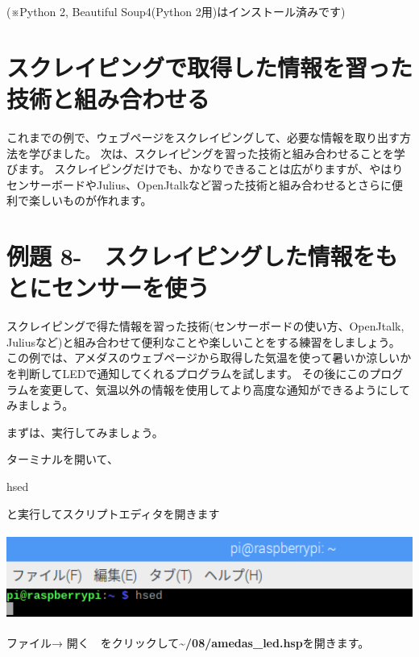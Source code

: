 \documentclass[a4paper,12pt,dvipdfmx]{jarticle}
\newcounter{Exercise}
\renewcommand\theExercise{例題 8-\arabic{Exercise}}
\begin{document}
(※Python 2, Beautiful Soup4(Python
2用)はインストール済みです)


\bigskip

\clearpage\section{スクレイピングで取得した情報を習った技術と組み合わせる}
これまでの例で、ウェブページをスクレイピングして、必要な情報を取り出す方法を学びました。
次は、スクレイピングを習った技術と組み合わせることを学びます。
スクレイピングだけでも、かなりできることは広がりますが、やはりセンサーボードやJulius、OpenJtalkなど習った技術と組み合わせるとさらに便利で楽しいものが作れます。

\clearpage\section{\theExercise　スクレイピングした情報をもとにセンサーを使う}
スクレイピングで得た情報を習った技術(センサーボードの使い方、OpenJtalk,
Juliusなど)と組み合わせて便利なことや楽しいことをする練習をしましょう。
この例では、アメダスのウェブページから取得した気温を使って暑いか涼しいかを判断してLEDで通知してくれるプログラムを試します。
その後にこのプログラムを変更して、気温以外の情報を使用してより高度な通知ができるようにしてみましょう。

まずは、実行してみましょう。

ターミナルを開いて、

hsed 

と実行してスクリプトエディタを開きます

\begin{center}
\includegraphics[width=17.057cm,height=2.866cm]{textbook-img013.png}

\end{center}
ファイル→
開く　をクリックして\textbf{\~{}/08/amedas\_led.hsp}を開きます。
\end{document}
